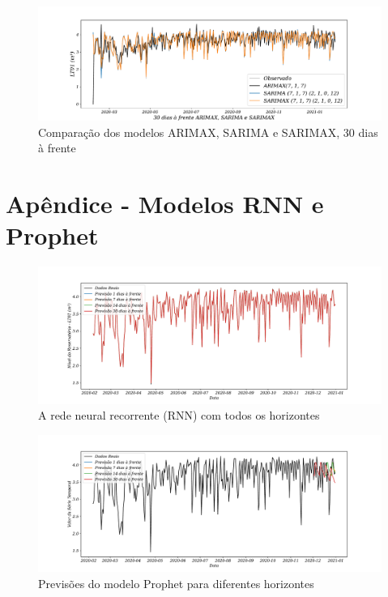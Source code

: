 \begin{figure}[H]
	\centering
	\caption{Comparação dos modelos ARIMAX, SARIMA e SARIMAX, 30 dias à frente }
	\label{fig:60-ARIMAX-SARIMA-SARIMAX24}
	\includegraphics[width=1\linewidth]{Apendices/Figuras/modelagem-24h/30-ARIMAX-SARIMA-SARIMAX}
	

\end{figure}

\newpage

\section{Ap\^endice - Modelos RNN e Prophet }\label{sec:rnnprophet}

\begin{figure}[H]
	\centering
	\caption{A rede neural recorrente (RNN) com todos os horizontes }
	\label{fig:rnn}
	\includegraphics[width=1\linewidth]{Apendices/Figuras/modelagem-24h/RNN}
	

\end{figure}

\begin{figure}[H]
	\centering
	\caption{Previsões do modelo Prophet para diferentes horizontes}
	\label{fig:prophet}
	\includegraphics[width=1\linewidth]{Apendices/Figuras/modelagem-24h/prophet}
	

\end{figure}